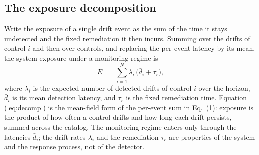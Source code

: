 \documentclass[journal]{IEEEtran}
\begin{document}
\subsection{The exposure decomposition}
Write the exposure of a single drift event as the sum of the time it stays undetected and the fixed
remediation it then incurs. Summing over the drifts of control $i$ and then over controls, and
replacing the per-event latency by its mean, the system exposure under a monitoring regime is
\begin{equation}
\label{eq:decomp}
E \;=\; \sum_{i=1}^{N} \lambda_i \,\big( \bar d_i + \tau_r \big),
\end{equation}
where $\lambda_i$ is the expected number of detected drifts of control $i$ over the horizon,
$\bar d_i$ is its mean detection latency, and $\tau_r$ is the fixed remediation time. Equation
(\ref{eq:decomp}) is the mean-field form of the per-event sum in Eq.~(1): exposure is the product of
how often a control drifts and how long each drift persists, summed across the catalog. The
monitoring regime enters only through the latencies $\bar d_i$; the drift rates $\lambda_i$ and the
remediation $\tau_r$ are properties of the system and the response process, not of the detector.
\end{document}
